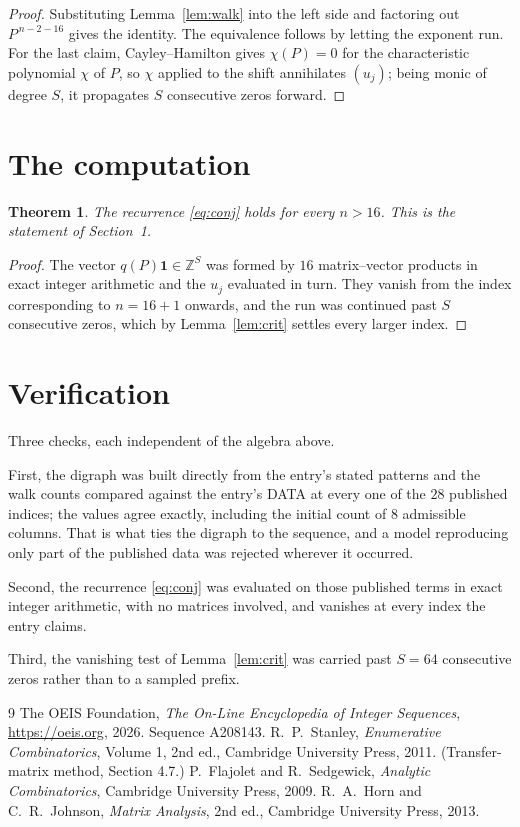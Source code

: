 \documentclass[11pt,a4paper]{article}
\theoremstyle{plain}
\newtheorem{theorem}{Theorem}
\theoremstyle{definition}
\begin{document}
\begin{proof}
Substituting Lemma~\ref{lem:walk} into the left side and factoring out
$P^{\,n-2-16}$ gives the identity. The equivalence follows by letting the exponent
run. For the last claim, Cayley--Hamilton gives $\chi(P)=0$ for the characteristic
polynomial $\chi$ of $P$, so $\chi$ applied to the shift annihilates $(u_j)$; being monic of
degree $S$, it propagates $S$ consecutive zeros forward.
\end{proof}

\section{The computation}

\begin{theorem}
The recurrence \eqref{eq:conj} holds for every $n>16$. This is the statement of
Section~1.
\end{theorem}

\begin{proof}
The vector $q(P)\mathbf{1}\in\mathbb{Z}^{S}$ was formed by $16$ matrix--vector
products in exact integer arithmetic and the $u_j$ evaluated in turn. They vanish from the
index corresponding to $n=16+1$ onwards, and the run was continued past $S$ consecutive
zeros, which by Lemma~\ref{lem:crit} settles every larger index.
\end{proof}

\section{Verification}

Three checks, each independent of the algebra above.

First, the digraph was built directly from the entry's stated patterns and the walk counts
compared against the entry's DATA at every one of the $28$ published indices; the
values agree exactly, including the initial count of $8$ admissible columns. That is
what ties the digraph to the sequence, and a model reproducing only part of the published
data was rejected wherever it occurred.

Second, the recurrence \eqref{eq:conj} was evaluated on those published terms in exact
integer arithmetic, with no matrices involved, and vanishes at every index the entry claims.

Third, the vanishing test of Lemma~\ref{lem:crit} was carried past $S=64$ consecutive
zeros rather than to a sampled prefix.

\begin{thebibliography}{9}
 The OEIS Foundation, \emph{The On-Line Encyclopedia of Integer
Sequences}, \url{https://oeis.org}, 2026. Sequence A208143.
 R.~P.~Stanley, \emph{Enumerative Combinatorics}, Volume 1, 2nd ed.,
Cambridge University Press, 2011. (Transfer-matrix method, Section 4.7.)
 P.~Flajolet and R.~Sedgewick, \emph{Analytic Combinatorics}, Cambridge
University Press, 2009.
 R.~A.~Horn and C.~R.~Johnson, \emph{Matrix Analysis}, 2nd ed., Cambridge
University Press, 2013.
\end{thebibliography}
\end{document}

